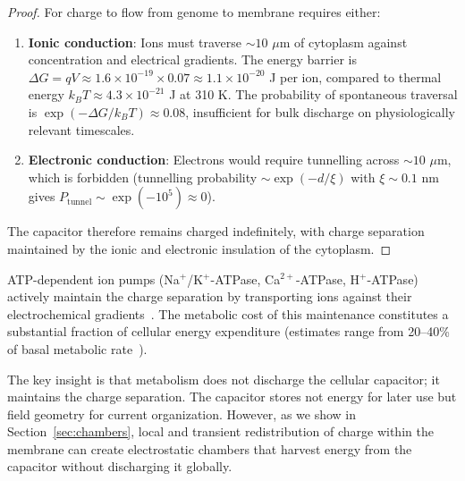 \documentclass[twocolumn,10pt,aps,prd,superscriptaddress,floatfix,nofootinbib]{revtex4-2}
\theoremstyle{remark}
\begin{document}
\begin{proof}
For charge to flow from genome to membrane requires either:
\begin{enumerate}
\item \textbf{Ionic conduction}: Ions must traverse $\sim 10$ $\mu$m of cytoplasm against concentration and electrical gradients. The energy barrier is $\Delta G = qV \approx 1.6 \times 10^{-19} \times 0.07 \approx 1.1 \times 10^{-20}$ J per ion, compared to thermal energy $k_B T \approx 4.3 \times 10^{-21}$ J at 310 K. The probability of spontaneous traversal is $\exp(-\Delta G/k_B T) \approx 0.08$, insufficient for bulk discharge on physiologically relevant timescales.

\item \textbf{Electronic conduction}: Electrons would require tunnelling across $\sim 10$ $\mu$m, which is forbidden (tunnelling probability $\sim \exp(-d/\xi)$ with $\xi \sim 0.1$ nm gives $P_{\mathrm{tunnel}} \sim \exp(-10^{5}) \approx 0$).
\end{enumerate}

The capacitor therefore remains charged indefinitely, with charge separation maintained by the ionic and electronic insulation of the cytoplasm.
\end{proof}

ATP-dependent ion pumps (Na$^+$/K$^+$-ATPase, Ca$^{2+}$-ATPase, H$^+$-ATPase) actively maintain the charge separation by transporting ions against their electrochemical gradients~\cite{Alberts2015}. The metabolic cost of this maintenance constitutes a substantial fraction of cellular energy expenditure (estimates range from 20--40\% of basal metabolic rate~\cite{Rolfe1997}).

The key insight is that metabolism does not discharge the cellular capacitor; it maintains the charge separation. The capacitor stores not energy for later use but field geometry for current organization. However, as we show in Section~\ref{sec:chambers}, local and transient redistribution of charge within the membrane can create electrostatic chambers that harvest energy from the capacitor without discharging it globally.
\end{document}
